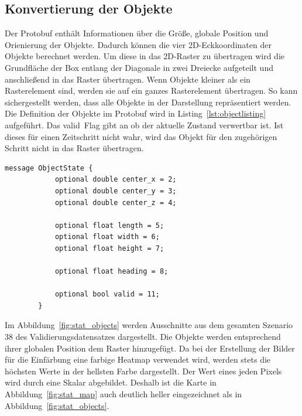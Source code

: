 \documentclass[12pt]{article}
\begin{document}
    \subsection{Konvertierung der Objekte}
        Der Protobuf enthält Informationen über die Größe, globale Position und Orienierung der Objekte. 
        Dadurch können die vier 2D-Eckkoordinaten der Objekte berechnet werden. Um diese in das 2D-Raster zu übertragen wird die Grundfläche der Box entlang der Diagonale in  
        zwei Dreiecke aufgeteilt und anschließend in das Raster übertragen. Wenn Objekte kleiner als ein Rasterelement sind, werden sie auf ein ganzes Rasterelement übertragen. 
        So kann sichergestellt werden, dass alle Objekte in der Darstellung repräsentiert werden.
        Die Definition der Objekte im Protobuf wird in Listing~\ref{lst:objectlisting} aufgeführt. 
        Das \grqq valid\grqq~Flag gibt an ob der aktuelle Zustand verwertbar ist. 
        Ist dieses für einen Zeitschritt nicht wahr, wird das Objekt für den zugehörigen Schritt nicht in das Raster übertragen.
        \vspace{0.5cm}
        \begin{lstlisting}[language=protobuf2, caption=Auszug aus scenario.proto, label={lst:objectlisting}]
        message ObjectState {
            optional double center_x = 2;
            optional double center_y = 3;
            optional double center_z = 4;
            
            optional float length = 5;
            optional float width = 6;
            optional float height = 7;

            optional float heading = 8;

            optional bool valid = 11;
        }
        \end{lstlisting}
        Im Abbildung~\ref{fig:stat_objects} werden Ausschnitte aus dem gesamten Szenario 38 des Validierungsdatensatzes dargestellt.
        Die Objekte werden entsprechend ihrer globalen Position dem Raster hinzugefügt.
        Da bei der Erstellung der Bilder für die Einfärbung eine farbige Heatmap verwendet wird, werden stets die höchsten Werte in der hellsten Farbe dargestellt. 
        Der Wert eines jeden Pixels wird durch eine Skalar abgebildet.
        Deshalb ist die Karte in Abbildung~\ref{fig:stat_map} auch deutlich heller eingezeichnet als in Abbildung~\ref{fig:stat_objects}.
\end{document}
